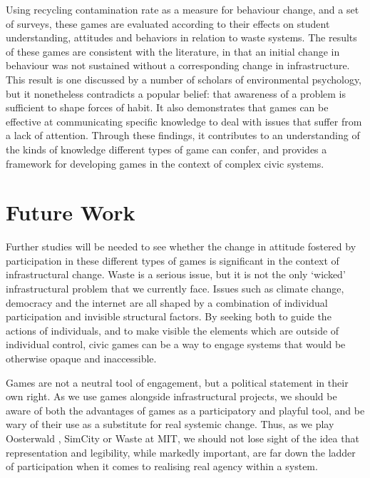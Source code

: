 \documentclass[nofonts,nols,justified,nobib]{tufte-book}
\begin{document}
Using recycling contamination rate as a measure for behaviour change, and a set of surveys, these games are evaluated according to their effects on student understanding, attitudes and behaviors in relation to waste systems. The results of these games are consistent with the literature, in that an initial change in behaviour was not sustained without a corresponding change in infrastructure. This result is one discussed by a number of scholars of environmental psychology, but it nonetheless contradicts a popular belief: that awareness of a problem is sufficient to shape forces of habit. It also demonstrates that games can be effective at communicating specific knowledge to deal with issues that suffer from a lack of attention. Through these findings, it contributes to an understanding of the kinds of knowledge different types of game can confer, and provides a framework for developing games in the context of complex civic systems.



\section*{Future Work}
Further studies will be needed to see whether the change in attitude fostered by participation in these different types of games is significant in the context of infrastructural change. Waste is a serious issue, but it is not the only `wicked' infrastructural problem that we currently face. Issues such as climate change, democracy and the internet are all shaped by a combination of individual participation and invisible structural factors. By seeking both to guide the actions of individuals, and to make visible the elements which are outside of individual control, civic games can be a way to engage systems that would be otherwise opaque and inaccessible.

Games are not a neutral tool of engagement, but a political statement in their own right. As we use games alongside infrastructural projects, we should be aware of both the advantages of games as a participatory and playful tool, and be wary of their use as a substitute for real systemic change. Thus, as we play Oosterwald \cite{play_the_city_play_2013}, SimCity or Waste at MIT, we should not lose sight of the idea that representation and legibility, while markedly important, are far down the ladder of participation when it comes to realising real agency within a system.

 
\end{document}
